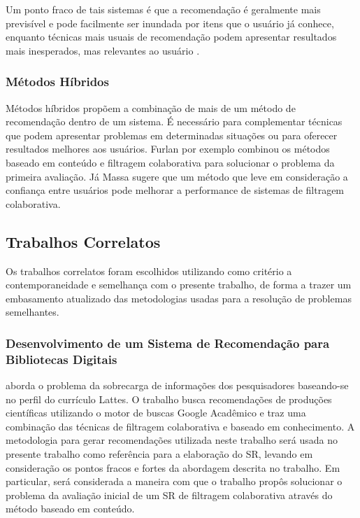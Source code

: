 \documentclass[12pt]{article}
\begin{document}
Um ponto fraco de tais sistemas é que a recomendação é geralmente mais previsível e pode facilmente ser inundada por itens que o 
usuário já conhece, enquanto técnicas mais usuais de recomendação podem apresentar resultados mais inesperados, mas relevantes ao 
usuário \cite{sinha2001comparing}.

\subsubsection{Métodos Híbridos}

Métodos híbridos propõem a combinação de mais de um método de recomendação dentro de um sistema. É necessário para complementar 
técnicas que podem apresentar problemas em determinadas situações ou para oferecer resultados melhores aos usuários. Furlan 
\cite{da2018desenvolvimento} por exemplo combinou os métodos baseado em conteúdo e filtragem colaborativa para solucionar o problema da primeira 
avaliação. Já Massa \cite{massa2004trust} sugere que um método que leve em consideração a confiança entre usuários pode melhorar a 
performance de sistemas de filtragem colaborativa.

\subsection{Trabalhos Correlatos}

Os trabalhos correlatos foram escolhidos utilizando como critério a contemporaneidade e semelhança com o presente trabalho, 
de forma a trazer um embasamento atualizado das metodologias usadas para a resolução de problemas semelhantes.

\subsubsection{Desenvolvimento de um Sistema de Recomendação para Bibliotecas Digitais}

\cite{da2018desenvolvimento} aborda o problema da sobrecarga de informações dos pesquisadores baseando-se no perfil do currículo Lattes. 
O trabalho busca recomendações de produções científicas utilizando o motor de buscas Google Acadêmico e traz uma combinação 
das técnicas de filtragem colaborativa e baseado em conhecimento. A metodologia para gerar recomendações utilizada neste 
trabalho será usada no presente trabalho como referência para a elaboração do SR, levando em consideração os pontos fracos 
e fortes da abordagem descrita no trabalho. Em particular, será considerada a maneira com que o trabalho propôs solucionar 
o problema  da avaliação inicial de um SR de filtragem colaborativa através do método baseado em conteúdo.
\end{document}
